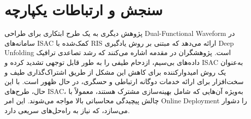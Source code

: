 \section{سنجش و ارتباطات یکپارچه}
پژوهش دیگری به یک طرح ابتکاری برای طراحی 
\gls{Dual-Functional Waveform}
در سامانه‌های 
\gls{ISAC}
کمک‌شده با 
\gls{RIS}
ارائه می‌دهد که مبتنی بر روش یادگیری 
\gls{Deep Unfolding}
است.
پژوهشگران در مقدمه اشاره می‌کنند که رشد تصاعدی ترافیک داده‌های بی‌سیم، ازدحام طیفی را به طور قابل توجهی تشدید کرده و 
\gls{ISAC}
به‌عنوان یک روش امیدوارکننده برای کاهش این مشکل از طریق اشتراک‌گذاری طیف و سخت‌افزار برای ارائه خدمات دوگانه ارتباطی و حسگری، در حال ظهور است. با این حال، طرح‌های 
\gls{ISAC}،
به‌ویژه آن‌هایی که شامل بهینه‌سازی مشترک هستند، معمولاً با چالش پیچیدگی محاسباتی بالا مواجه می‌شوند. این امر 
\gls{Online Deployment}
را دشوار می‌سازد، که نیاز به راه‌حل‌های سریعی دارد.

